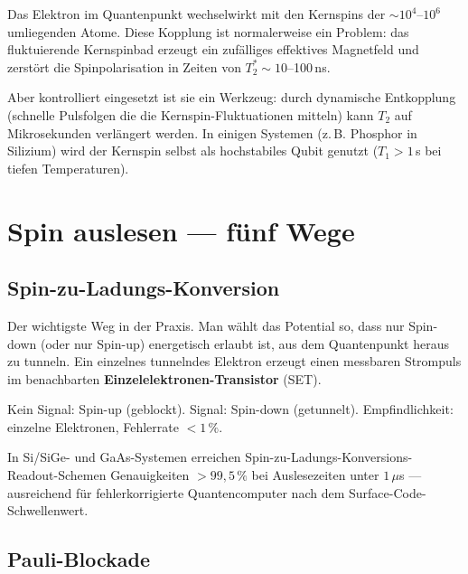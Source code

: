 Das Elektron im Quantenpunkt wechselwirkt mit den
Kernspins der $\sim 10^4$--$10^6$ umliegenden Atome.
Diese Kopplung ist normalerweise ein Problem:
das fluktuierende Kernspinbad erzeugt ein
zufälliges effektives Magnetfeld und zerstört
die Spinpolarisation in Zeiten von $T_2^* \sim 10$--100\,ns.

Aber kontrolliert eingesetzt ist sie ein Werkzeug:
durch dynamische Entkopplung (schnelle Pulsfolgen
die die Kernspin-Fluktuationen mitteln)
kann $T_2$ auf Mikrosekunden verlängert werden.
In einigen Systemen (z.\,B. Phosphor in Silizium)
wird der Kernspin selbst als hochstabiles Qubit genutzt
($T_1 > 1$\,s bei tiefen Temperaturen).

\section{Spin auslesen --- fünf Wege}
\label{sec:spin-auslesen}

\subsection{Spin-zu-Ladungs-Konversion}
\label{sec:spin-ladung}

Der wichtigste Weg in der Praxis.
Man wählt das Potential so, dass nur Spin-down
(oder nur Spin-up) energetisch erlaubt ist,
aus dem Quantenpunkt heraus zu tunneln.
Ein einzelnes tunnelndes Elektron erzeugt einen
messbaren Strompuls im benachbarten
\textbf{Einzelelektronen-Transistor} (SET).

Kein Signal: Spin-up (geblockt).
Signal: Spin-down (getunnelt).
Empfindlichkeit: einzelne Elektronen, Fehlerrate $< 1\,\%$.

\begin{keyresult}
In Si/SiGe- und GaAs-Systemen erreichen
Spin-zu-Ladungs-Konversions-Readout-Schemen
Genauigkeiten $> 99{,}5\,\%$ bei Auslesezeiten
unter $1\,\mu$s --- ausreichend für fehlerkorrigierte
Quantencomputer nach dem Surface-Code-Schwellenwert.
\end{keyresult}

\subsection{Pauli-Blockade}
\label{sec:pauli}


